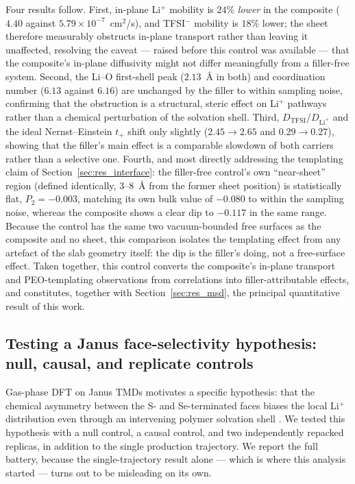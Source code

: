 \documentclass[review, 12pt]{elsarticle}
\numberwithin{equation}{section}
\newcommand{\sect}[1] {Section~\ref{#1}}
\newcommand{\DLi}{D_{\mathrm{Li}^+}}
\begin{document}
Four results follow. First, in-plane Li$^+$ mobility is $24\%$ \emph{lower} in the composite ($4.40$ against $5.79\times10^{-7}$~cm$^2$/s), and TFSI$^-$ mobility is $18\%$ lower; the sheet therefore measurably obstructs in-plane transport rather than leaving it unaffected, resolving the caveat --- raised before this control was available --- that the composite's in-plane diffusivity might not differ meaningfully from a filler-free system. Second, the Li--O first-shell peak ($2.13$~\AA{} in both) and coordination number ($6.13$ against $6.16$) are unchanged by the filler to within sampling noise, confirming that the obstruction is a structural, steric effect on Li$^+$ pathways rather than a chemical perturbation of the solvation shell. Third, $D_{\mathrm{TFSI}}/\DLi$ and the ideal Nernst--Einstein $t_+$ shift only slightly ($2.45\to2.65$ and $0.29\to0.27$), showing that the filler's main effect is a comparable slowdown of both carriers rather than a selective one. Fourth, and most directly addressing the templating claim of \sect{sec:res_interface}: the filler-free control's own ``near-sheet'' region (defined identically, $3$--$8$~\AA{} from the former sheet position) is statistically flat, $P_2=-0.003$, matching its own bulk value of $-0.080$ to within the sampling noise, whereas the composite shows a clear dip to $-0.117$ in the same range. Because the control has the same two vacuum-bounded free surfaces as the composite and no sheet, this comparison isolates the templating effect from any artefact of the slab geometry itself: the dip is the filler's doing, not a free-surface effect. Taken together, this control converts the composite's in-plane transport and PEO-templating observations from correlations into filler-attributable effects, and constitutes, together with \sect{sec:res_msd}, the principal quantitative result of this work.

\subsection{Testing a Janus face-selectivity hypothesis: null, causal, and replicate controls}\label{sec:res_janus}
Gas-phase DFT on Janus TMDs motivates a specific hypothesis: that the chemical asymmetry between the S- and Se-terminated faces biases the local Li$^+$ distribution even through an intervening polymer solvation shell \cite{zhang_langmuir_2024_zrsse, sharma_acsanm_2026_mosse, ahmad_apsusc_2023_wsse}. We tested this hypothesis with a null control, a causal control, and two independently repacked replicas, in addition to the single production trajectory. We report the full battery, because the single-trajectory result alone --- which is where this analysis started --- turns out to be misleading on its own.
\end{document}
